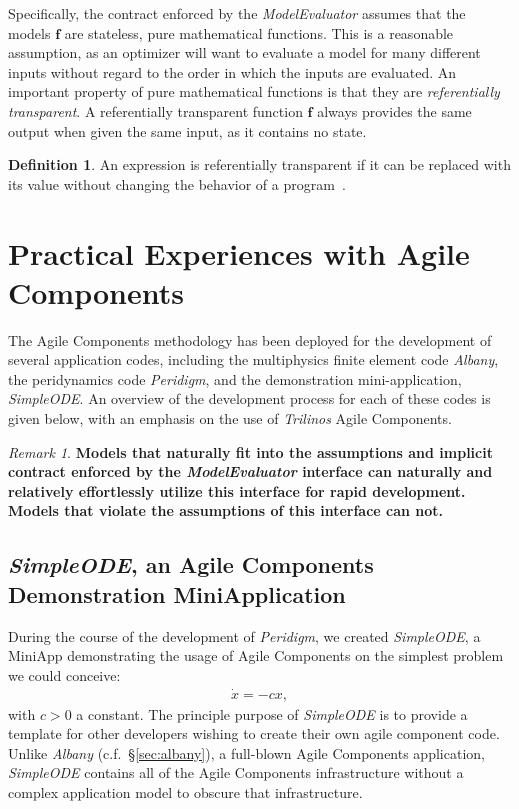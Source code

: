 \documentclass[pdf,ps2pdf,12pt,report]{SANDreport}
\theoremstyle{plain}
\theoremstyle{definition}
\newtheorem{defn}{Definition}[section]
\theoremstyle{remark}
\newtheorem{rem}{Remark}[section]
\numberwithin{equation}{section}
\begin{document}
Specifically, the contract enforced by the \emph{ModelEvaluator} assumes that the models $\mathbf{f}$ are stateless, pure mathematical functions. This is a reasonable assumption, as an optimizer will want to evaluate a model for many different inputs without regard to the order in which the inputs are evaluated. An important property of pure mathematical functions is that they are \emph{referentially transparent}. A referentially transparent function $\mathbf{f}$ always provides the same output when given the same input, as it contains no state.
\begin{defn} \label{defn:RT}
An expression is referentially transparent if it can be replaced with its value without changing the behavior of a program~\cite{HGVJ:1994:DesignPatterns}.
\end{defn}

\section{Practical Experiences with Agile Components}

The Agile Components methodology has been deployed for the development of several application codes, including the multiphysics finite element code \emph{Albany}, the peridynamics code \emph{Peridigm}, and the demonstration mini-application, \emph{SimpleODE}.  An overview of the development process for each of these codes is given below, with an emphasis on the use of \emph{Trilinos} Agile Components.

\begin{rem}
\textbf{Models that naturally fit into the assumptions and implicit contract enforced by the \emph{ModelEvaluator} interface can naturally and relatively effortlessly utilize this interface for rapid development. Models that violate the assumptions of this interface can not.}
\end{rem}

\subsection{\emph{SimpleODE}, an Agile Components Demonstration MiniApplication} \label{sec:simpleode}

During the course of the development of \emph{Peridigm}, we created \emph{SimpleODE}, a MiniApp demonstrating the usage of Agile Components on the simplest problem we could conceive:
\begin{align}
  \dot{x} = -c x,
\end{align}
with $c>0$ a constant. The principle purpose of \emph{SimpleODE} is to provide a template for other developers wishing to create their own agile component code. Unlike \emph{Albany} (c.f.~\S\ref{sec:albany}), a full-blown Agile Components application, \emph{SimpleODE} contains all of the Agile Components infrastructure without a complex application model to obscure that infrastructure.
\end{document}
